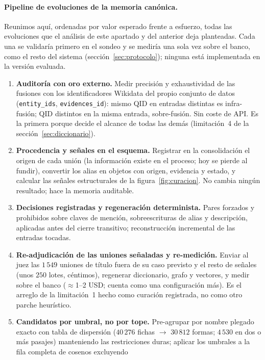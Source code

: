 \documentclass[11pt,a4paper]{article}
\begin{document}
\paragraph{Pipeline de evoluciones de la memoria canónica.}
Reunimos aquí, ordenadas por valor esperado frente a esfuerzo, todas las
evoluciones que el análisis de este apartado y del anterior deja
planteadas. Cada una se validaría primero en el sondeo y se mediría una
sola vez sobre el banco, como el resto del sistema
(sección~\ref{sec:protocolo}); ninguna está implementada en la versión
evaluada.
\begin{enumerate}[leftmargin=1.8em, itemsep=1pt, label=E\arabic*.]
\item \textbf{Auditoría con oro externo.} Medir precisión y exhaustividad
  de las fusiones con los identificadores Wikidata del propio conjunto de
  datos (\texttt{entity\_ids}, \texttt{evidences\_id}): mismo QID en
  entradas distintas es infra-fusión; QID distintos en la misma entrada,
  sobre-fusión. Sin coste de API. Es la primera porque decide el alcance de
  todas las demás (limitación~4 de la sección~\ref{sec:diccionario}).
\item \textbf{Procedencia y señales en el esquema.} Registrar en la
  consolidación el origen de cada unión (la información existe en el
  proceso; hoy se pierde al fundir), convertir los alias en objetos con
  origen, evidencia y estado, y calcular las señales estructurales de la
  figura~\ref{fig:curacion}. No cambia ningún resultado; hace la memoria
  auditable.
\item \textbf{Decisiones registradas y regeneración determinista.} Pares
  forzados y prohibidos sobre claves de mención, sobreescrituras de alias y
  descripción, aplicadas antes del cierre transitivo; reconstrucción
  incremental de las entradas tocadas.
\item \textbf{Re-adjudicación de las uniones señaladas y re-medición.}
  Enviar al juez las $1\,549$ uniones de título fuera de su caso previsto
  y el resto de señales (unos $250$ lotes, céntimos), regenerar
  diccionario, grafo y vectores, y medir sobre el banco (${\approx}$1--2
  USD; cuenta como una configuración más). Es el arreglo de la
  limitación~1 hecho como curación registrada, no como otro parche
  heurístico.
\item \textbf{Candidatos por umbral, no por tope.} Pre-agrupar por nombre
  plegado exacto con tabla de dispersión ($40\,276$ fichas $\to$ $30\,812$
  formas; $4\,530$ en dos o más pasajes) manteniendo las restricciones
  duras; aplicar los umbrales a la fila completa de cosenos excluyendo

\end{enumerate}
\end{document}
